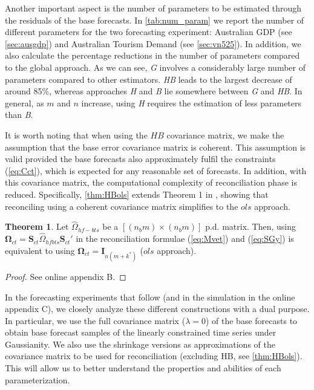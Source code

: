 \documentclass[review, 11pt]{elsarticle}
\newcommand{\Ivet}{\bm{I}}
\newcommand{\Svet}{\bm{S}}
\newcommand{\Omegavet}{\bm{\Omega}}
\theoremstyle{definition}
\newtheorem{theorem}{Theorem}[section]
\begin{document}
Another important aspect is the number of parameters to be estimated through the residuals of the base forecasts. In \autoref{tab:num_param} we report the number of different parameters %
for the two forecasting experiment: Australian GDP (see \autoref{sec:ausgdp}) and Australian Tourism Demand (see \autoref{sec:vn525}). In addition, we also calculate the percentage reductions in the number of parameters compared to the global approach. %
As we can see, \textit{G} involves a considerably large number of parameters compared to other estimators. \textit{HB} leads to the largest decrease of around 85\%, whereas approaches \textit{H} and \textit{B}  lie somewhere between \textit{G} and \textit{HB}. In general, as $m$ and $n$ increase, using \textit{H} requires the estimation of less parameters than \textit{B}.

{\color{blue}
It is worth noting that when using the $HB$ covariance matrix, we make the assumption that the base error covariance matrix is coherent. This assumption is valid provided the base forecasts also approximately fulfil the constraints (\ref{eq:Cct}), which is expected for any reasonable set of forecasts. %
In addition, with this covariance matrix, the computational complexity of reconciliation phase is reduced. Specifically, \autoref{thm:HBols} extends %
Theorem 1 in \cite{hyndman2011}, showing that reconciling using a coherent covariance matrix simplifies to the $ols$ approach.
\begin{theorem}\label{thm:HBols}
	Let $\widehat{\Omega}_{hf-bts}$ be a $[(n_bm)\times (n_bm)]$ p.d. matrix. Then, using $\Omegavet_{ct} = \Svet_{ct}\widehat{\Omega}_{hfbts}\Svet_{ct}'$ in the reconciliation formulae (\ref{eq:Mvet}) and (\ref{eq:SGy}) is equivalent to using $\Omegavet_{ct} = \Ivet_{n(m+k^\ast)}$ ($ols$ approach).
\end{theorem}
\begin{proof}
	See online appendix B.
\end{proof}
}

In the forecasting experiments that follow (and in the simulation in the online appendix C), we closely analyze these different constructions with a dual purpose. In particular, we use the full covariance matrix ($\lambda = 0$) of the base forecasts to obtain base forecast samples of the linearly constrained time series under Gaussianity. We also use the shrinkage versions as approximations of the covariance matrix to be used for reconciliation {\color{blue}(excluding HB, see \autoref{thm:HBols})}. This will allow us to better understand the properties and abilities of each parameterization.
\end{document}
